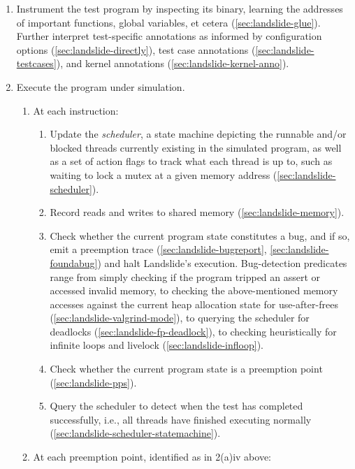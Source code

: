 {\begin{enumerate}
	\item Instrument the test program by inspecting its binary,
		learning the addresses of important functions, global variables, et cetera
		(\cref{sec:landslide-glue}).
		Further interpret test-specific annotations
		as informed by
		configuration options (\cref{sec:landslide-directly}),
		test case annotations (\cref{sec:landslide-testcases}),
		and
		kernel annotations (\cref{sec:landslide-kernel-anno}).
	\item Execute the program under simulation.
		\begin{enumerate}
			\item At each instruction:
				\begin{enumerate}
					\item Update the {\em scheduler},
						a state machine depicting the runnable and/or blocked
						threads currently existing in the simulated program,
						as well as a set of action flags to track what each thread is up to,
						such as waiting to lock a mutex at a given memory address
						(\cref{sec:landslide-scheduler}).
					\item Record reads and writes to shared memory (\cref{sec:landslide-memory}).
					\item Check whether the current program state constitutes a bug,
						and if so,
						emit a preemption trace
						(\cref{sec:landslide-bugreport},
						\cref{sec:landslide-foundabug})
						and halt Landslide's execution.
						Bug-detection predicates range from
						simply checking if the program tripped an assert
						or accessed invalid memory,
						to checking the above-mentioned memory accesses against the current
						heap allocation state for use-after-frees (\cref{sec:landslide-valgrind-mode}),
						to querying the scheduler for deadlocks (\cref{sec:landslide-fp-deadlock}),
						to checking heuristically for infinite loops and livelock
						(\cref{sec:landslide-infloop}).
					\item Check whether the current program state is a preemption point
						(\cref{sec:landslide-pps}).
					\item Query the scheduler to detect when the test has completed successfully,
						i.e., all threads have finished executing normally
						(\cref{sec:landslide-scheduler-statemachine}).
				\end{enumerate}
			\item At each preemption point, identified as in 2(a)iv above:
				\begin{enumerate}

\end{enumerate}
\end{enumerate}
\end{enumerate}}
